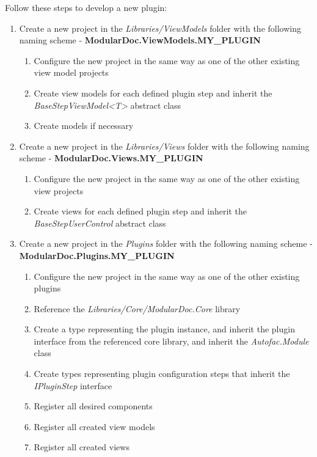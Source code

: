 Follow these steps to develop a new plugin:
\begin{enumerate}
    \item Create a new project in the \textit{Libraries/ViewModels} folder with the following naming scheme - \textbf{ModularDoc.ViewModels.MY\_PLUGIN}
    \begin{enumerate}
        \item Configure the new project in the same way as one of the other existing view model projects
        \item Create view models for each defined plugin step and inherit the \textit{BaseStepViewModel<T>} abstract class
        \item Create models if necessary
    \end{enumerate}
    \item Create a new project in the \textit{Libraries/Views} folder with the following naming scheme - \textbf{ModularDoc.Views.MY\_PLUGIN}
    \begin{enumerate}
        \item Configure the new project in the same way as one of the other existing view projects
        \item Create views for each defined plugin step and inherit the \textit{BaseStepUserControl} abstract class
    \end{enumerate}
    \item Create a new project in the \textit{Plugins} folder with the following naming scheme - \textbf{ModularDoc.Plugins.MY\_PLUGIN}
    \begin{enumerate}
        \item Configure the new project in the same way as one of the other existing plugins
        \item Reference the \textit{Libraries/Core/ModularDoc.Core} library
        \item Create a type representing the plugin instance, and inherit the plugin interface from the referenced core library, and inherit the \textit{Autofac.Module} class
        \item Create types representing plugin configuration steps that inherit the \textit{IPluginStep} interface
        \item Register all desired components
        \item Register all created view models
        \item Register all created views
    \end{enumerate}
\end{enumerate}